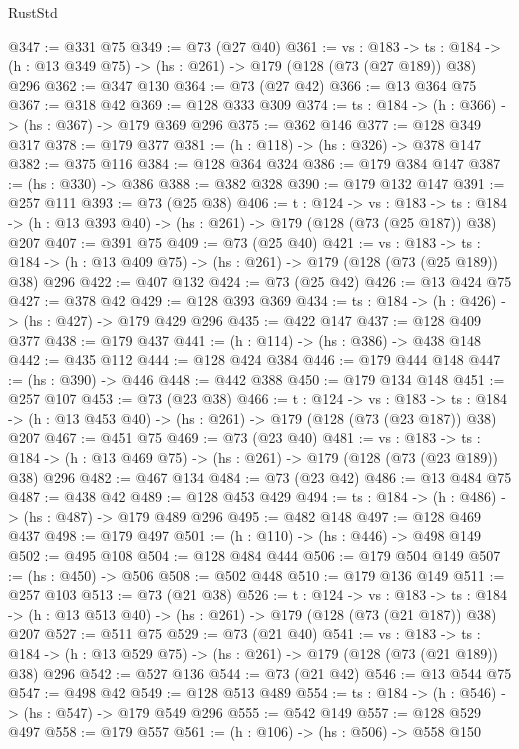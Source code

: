\begin{lexlean}{RustStd}
\begin{coremodule}
@347 := @331 @75
@349 := @73 (@27 @40)
@361 := {vs : @183} ->
  {ts : @184} -> (h : @13 @349 @75) -> (hs : @261) -> @179 (@128 (@73 (@27 @189)) @38) @296
@362 := @347 @130
@364 := @73 (@27 @42)
@366 := @13 @364 @75
@367 := @318 @42
@369 := @128 @333 @309
@374 := {ts : @184} -> (h : @366) -> (hs : @367) -> @179 @369 @296
@375 := @362 @146
@377 := @128 @349 @317
@378 := @179 @377
@381 := (h : @118) -> (hs : @326) -> @378 @147
@382 := @375 @116
@384 := @128 @364 @324
@386 := @179 @384 @147
@387 := (hs : @330) -> @386
@388 := @382 @328
@390 := @179 @132 @147
@391 := @257 @111
@393 := @73 (@25 @38)
@406 := {t : @124} ->
  {vs : @183} ->
  {ts : @184} -> (h : @13 @393 @40) -> (hs : @261) -> @179 (@128 (@73 (@25 @187)) @38) @207
@407 := @391 @75
@409 := @73 (@25 @40)
@421 := {vs : @183} ->
  {ts : @184} -> (h : @13 @409 @75) -> (hs : @261) -> @179 (@128 (@73 (@25 @189)) @38) @296
@422 := @407 @132
@424 := @73 (@25 @42)
@426 := @13 @424 @75
@427 := @378 @42
@429 := @128 @393 @369
@434 := {ts : @184} -> (h : @426) -> (hs : @427) -> @179 @429 @296
@435 := @422 @147
@437 := @128 @409 @377
@438 := @179 @437
@441 := (h : @114) -> (hs : @386) -> @438 @148
@442 := @435 @112
@444 := @128 @424 @384
@446 := @179 @444 @148
@447 := (hs : @390) -> @446
@448 := @442 @388
@450 := @179 @134 @148
@451 := @257 @107
@453 := @73 (@23 @38)
@466 := {t : @124} ->
  {vs : @183} ->
  {ts : @184} -> (h : @13 @453 @40) -> (hs : @261) -> @179 (@128 (@73 (@23 @187)) @38) @207
@467 := @451 @75
@469 := @73 (@23 @40)
@481 := {vs : @183} ->
  {ts : @184} -> (h : @13 @469 @75) -> (hs : @261) -> @179 (@128 (@73 (@23 @189)) @38) @296
@482 := @467 @134
@484 := @73 (@23 @42)
@486 := @13 @484 @75
@487 := @438 @42
@489 := @128 @453 @429
@494 := {ts : @184} -> (h : @486) -> (hs : @487) -> @179 @489 @296
@495 := @482 @148
@497 := @128 @469 @437
@498 := @179 @497
@501 := (h : @110) -> (hs : @446) -> @498 @149
@502 := @495 @108
@504 := @128 @484 @444
@506 := @179 @504 @149
@507 := (hs : @450) -> @506
@508 := @502 @448
@510 := @179 @136 @149
@511 := @257 @103
@513 := @73 (@21 @38)
@526 := {t : @124} ->
  {vs : @183} ->
  {ts : @184} -> (h : @13 @513 @40) -> (hs : @261) -> @179 (@128 (@73 (@21 @187)) @38) @207
@527 := @511 @75
@529 := @73 (@21 @40)
@541 := {vs : @183} ->
  {ts : @184} -> (h : @13 @529 @75) -> (hs : @261) -> @179 (@128 (@73 (@21 @189)) @38) @296
@542 := @527 @136
@544 := @73 (@21 @42)
@546 := @13 @544 @75
@547 := @498 @42
@549 := @128 @513 @489
@554 := {ts : @184} -> (h : @546) -> (hs : @547) -> @179 @549 @296
@555 := @542 @149
@557 := @128 @529 @497
@558 := @179 @557
@561 := (h : @106) -> (hs : @506) -> @558 @150

\end{coremodule}
\end{lexlean}
